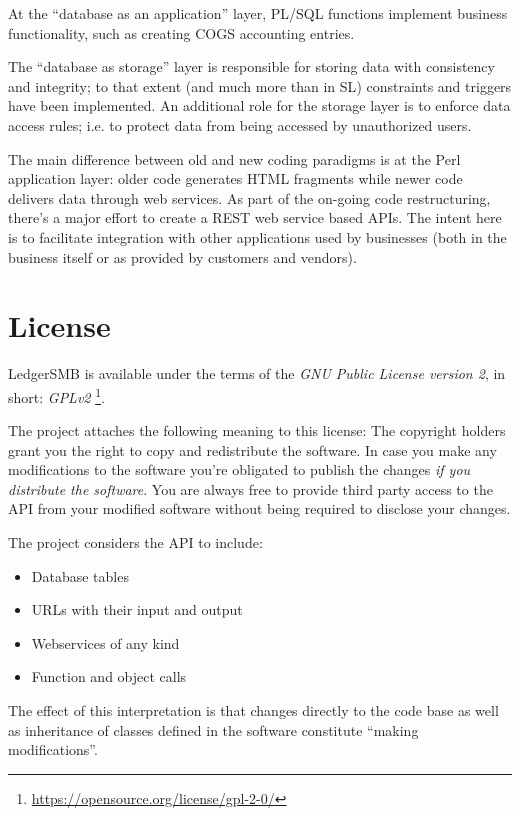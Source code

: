 At the ``database as an application'' layer, \gls{PL/SQL} functions implement business
functionality, such as creating \gls{COGS} accounting entries.

The ``database as storage'' layer is responsible for storing data with consistency and
integrity; to that extent (and much more than in \acrshort{SL}) constraints and triggers
have been implemented.  An additional role for the storage layer is to enforce data
access rules; i.e. to protect data from being accessed by unauthorized users.

The main difference between old and new coding paradigms is at the Perl application
layer: older code generates HTML fragments while newer code delivers data through
web services.  As part of the on-going code restructuring, there's a major effort
to create a \gls{REST} web service based APIs.  The intent here is to facilitate
integration with other applications used by businesses (both in the business itself
or as provided by customers and vendors).






\section{License}
\label{sec-ledgersmb-license}

LedgerSMB is available under the terms of the
\textit{GNU Public License version 2}, in short: \textit{GPLv2}
\footnote{\url{https://opensource.org/license/gpl-2-0/}}.

The project attaches the following meaning to this license:
The copyright holders grant you the right to copy and
redistribute the software.  In case you make any modifications to the software
you're obligated to publish the changes \textit{if you distribute the software}.  You are always free to provide third party access to
the \acrshort{API} from your modified software without being required to disclose your changes.

The project considers the \acrshort{API} to include:
\begin{itemize}
\item Database tables
\item URLs with their input and output
\item Webservices of any kind
\item Function and object calls
\end{itemize}

The effect of this interpretation is that changes directly to the code base as well as inheritance of classes defined in the software constitute ``making modifications''.

